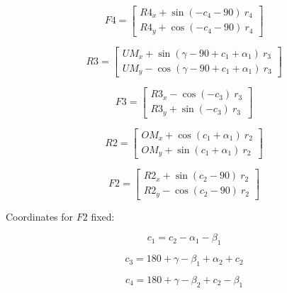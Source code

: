\documentclass[10pt,a4paper]{article}
\begin{document}
\begin{multicols}{2}
\begin{equation}
F4 =  \begin{bmatrix} 
R4_x + \sin(-c_4-90)~r_4 \\
R4_y + \cos(-c_4-90)~r_4 \end{bmatrix}
\end{equation}

\begin{equation}
R3 =  \begin{bmatrix} 
UM_x + \sin(\gamma - 90 + c_1 + \alpha_1)~r_3 \\
UM_y - \cos(\gamma - 90 + c_1 + \alpha_1)~r_3 \end{bmatrix}
\end{equation}

\begin{equation}
F3 =  \begin{bmatrix} 
R3_x - \cos(-c_3)~r_3 \\
R3_y + \sin(-c_3)~r_3 \end{bmatrix}
\end{equation}


\begin{equation}
R2 =  \begin{bmatrix} 
OM_x + \cos(c_1 + \alpha_1)~r_2 \\
OM_y + \sin(c_1 + \alpha_1)~r_2 \end{bmatrix}
\end{equation}

\begin{equation}
F2 =  \begin{bmatrix} 
R2_x + \sin(c_2 - 90)~r_2 \\
R2_y - \cos(c_2 - 90)~r_2 \end{bmatrix}
\label{eq:F1_end}
\end{equation}

\columnbreak


Coordinates for $F2$ fixed:

\begin{equation}
c_1 = c_2 - \alpha_1 - \beta_1
\label{eq:F2_start}
\end{equation}

\begin{equation}
c_3 = 180 + \gamma - \beta_1 + \alpha_2 + c_2
\end{equation}

\begin{equation}
c_4 = 180 + \gamma - \beta_2 + c_2 - \beta_1
\end{equation}



\end{multicols}
\end{document}

